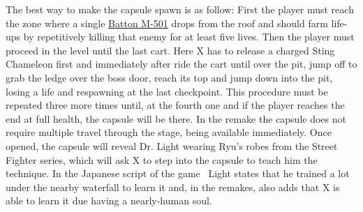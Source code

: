 The best way to make the capsule spawn is as follow: First the player must reach the zone where a single \hyperlink{enem:Batton_M-501}{Batton M-501} drops from the roof  and should farm life-ups by repetitively killing that enemy for at least five lives. Then the player must proceed in the level until the last cart. Here X has to release a charged Sting Chameleon first and immediately after ride the cart until over the pit, jump off to grab the ledge over the boss door, reach its top and jump down into the pit, losing a life and respawning at the last checkpoint. This procedure must be  repeated three more times until, at the  fourth one and if the player reaches the end at full health, the capsule will be there. In the remake the capsule does not require multiple travel through the stage, being available immediately. Once opened, the capsule will reveal Dr. Light wearing Ryu's robes from the Street Fighter series, which will ask X to step into the capsule to teach him the technique. In the Japanese  script of the game~\cite{wordpress:X_japanese_script} Light states that he trained a lot under the nearby waterfall to learn it and, in the remakes, also adds that X is able to learn it due having a nearly-human soul.

